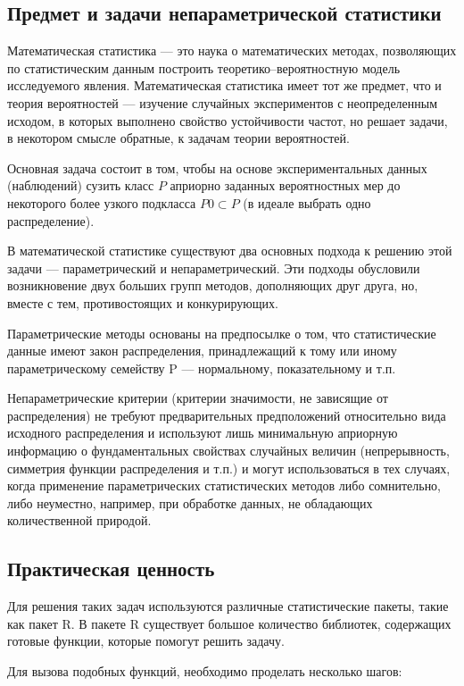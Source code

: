 \documentclass[14pt,a4paper]{scrartcl}
\begin{document}
    \subsection{Предмет и задачи непараметрической статистики}
    Математическая статистика --- это наука о математических методах, позволяющих по статистическим данным построить теоретико–вероятностную модель исследуемого явления. Математическая статистика имеет тот же предмет, что и теория  вероятностей --- изучение случайных экспериментов с неопределенным исходом, в которых выполнено свойство устойчивости частот, но решает задачи, в некотором  смысле обратные, к задачам теории вероятностей.

    Основная задача состоит в том, чтобы на основе экспериментальных данных (наблюдений) сузить класс $P$ априорно заданных вероятностных мер до некоторого более узкого подкласса $P0 \subset P$ (в идеале выбрать одно распределение).

    В математической статистике существуют два основных подхода к решению этой задачи ---  параметрический и непараметрический. Эти подходы обусловили возникновение двух больших групп методов, дополняющих друг друга, но, вместе с тем, противостоящих и конкурирующих.

    Параметрические методы основаны на предпосылке о том, что статистические данные имеют закон распределения, принадлежащий к тому или иному параметрическому семейству P --- нормальному, показательному и т.п.

    Непараметрические критерии (критерии значимости, не зависящие от распределения) не требуют предварительных предположений относительно вида исходного распределения и используют лишь минимальную априорную информацию о фундаментальных свойствах случайных величин (непрерывность, симметрия функции распределения и т.п.) и могут использоваться в тех случаях, когда применение параметрических статистических методов либо сомнительно, либо неуместно, например, при обработке данных, не обладающих количественной природой.

    \subsection{Практическая ценность}
    Для решения таких задач используются различные статистические пакеты, такие как пакет R. В пакете R существует большое количество библиотек, содержащих готовые функции, которые помогут решить задачу.

    Для вызова подобных функций, необходимо проделать несколько шагов:
\end{document}
